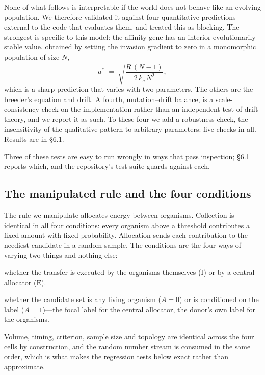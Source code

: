 \documentclass[review,3p,times]{elsarticle}
\begin{document}
None of what follows is interpretable if the world does not behave like an
evolving population. We therefore validated it against four quantitative
predictions external to the code that evaluates them, and treated this as
blocking. The strongest is specific to this model: the affinity gene has an
interior evolutionarily stable value, obtained by setting the invasion gradient
to zero in a monomorphic population of size $N$,
\begin{equation}
a^{*} \;=\; \sqrt{\frac{R\,(N-1)}{2\,k_c\,N^{2}}} ,
\label{eq:ess}
\end{equation}
which is a sharp prediction that varies with two parameters. The others are the
breeder's equation and drift. A fourth, mutation--drift balance, is a
scale-consistency check on the implementation rather than an independent test
of drift theory, and we report it as such. To these four we add a robustness
check, the insensitivity of the qualitative pattern to arbitrary parameters:
five checks in all. Results are in \S6.1.

Three of these tests are easy to run wrongly in ways that pass inspection;
\S6.1 reports which, and the repository's test suite guards against each.

\subsection{The manipulated rule and the four conditions}

The rule we manipulate allocates energy between organisms. Collection is
identical in all four conditions: every organism above a threshold contributes
a fixed amount with fixed probability. Allocation sends each contribution to
the neediest candidate in a random sample. The conditions are the four ways of
varying two things and nothing else:

\begin{description}[leftmargin=*,style=nextline,itemsep=1pt]
\item[$C$:] whether the transfer is executed by the organisms themselves
($\mathrm{I}$) or by a central allocator ($\mathrm{E}$).
\item[$A$:] whether the candidate set is any living organism ($A=0$) or is
conditioned on the label ($A=1$)---the focal label for the central allocator,
the donor's own label for the organisms.
\end{description}

Volume, timing, criterion, sample size and topology are identical across the
four cells by construction, and the random number stream is consumed in the
same order, which is what makes the regression tests below exact rather than
approximate.
\end{document}
